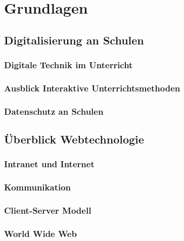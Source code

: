 \section{Grundlagen}\label{sec:grundlagen}
\subsection{Digitalisierung an Schulen}
\subsubsection{Digitale Technik im Unterricht}\label{sec:technikunterricht}
\subsubsection{Ausblick Interaktive Unterrichtsmethoden}\label{sec:interaktiveunterr}
\subsubsection{Datenschutz an Schulen}\label{sec:datenschutz}

\subsection{Überblick Webtechnologie}\label{sec:webbasedsoftware}

\subsubsection{Intranet und Internet}\label{sec:intranetundinternet}
\subsubsection{Kommunikation}\label{sec:kommunikation}
\subsubsection{Client-Server Modell}\label{sec:clientservermodell}

\subsubsection{World Wide Web}\label{sec:www}
%
